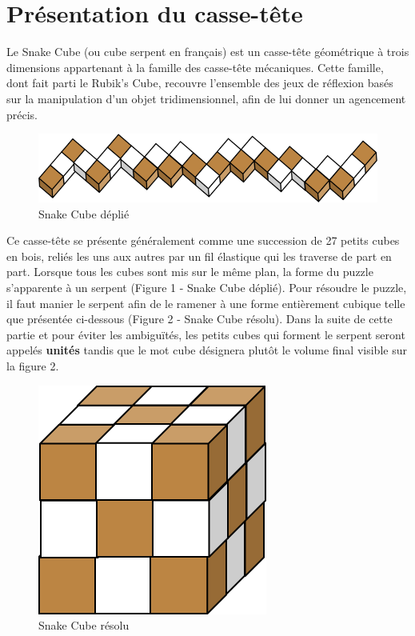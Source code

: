 \chapter{Présentation du casse-tête}
Le Snake Cube (ou cube serpent en français) est un casse-tête géométrique à trois dimensions appartenant à la famille des casse-tête mécaniques. Cette famille, dont fait parti le Rubik’s Cube, recouvre l’ensemble des jeux de réflexion basés sur la manipulation d’un objet tridimensionnel, afin de lui donner un agencement précis.

\begin{figure}[h]
 \centering
 \includegraphics[scale=0.5,keepaspectratio=true]{img/snakeCubeFlat.png}
 \caption{Snake Cube déplié}
\end{figure}

Ce casse-tête se présente généralement comme une succession de 27 petits cubes en bois, reliés les uns aux autres par un fil élastique qui les traverse de part en part. Lorsque tous les cubes sont mis sur le même plan, la forme du puzzle s’apparente à un serpent  (Figure 1 - Snake Cube déplié). Pour résoudre le puzzle, il faut manier le serpent afin de le ramener à une forme entièrement cubique telle que présentée ci-dessous (Figure 2 - Snake Cube résolu). Dans la suite de cette partie et pour éviter les ambiguïtés, les petits cubes qui forment le serpent seront appelés \textbf{unités} tandis que le mot cube désignera plutôt le volume final visible sur la figure 2.

\begin{figure}[h]
 \centering
 \includegraphics[scale=0.5,keepaspectratio=true]{img/snakeCubeSolved.png}
 \caption{Snake Cube résolu}
\end{figure}

